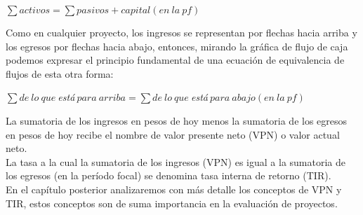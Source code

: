 \begin{center}
   $\sum activos = \sum pasivos + capital(en\ la\ pf)$\\
\end{center}

Como en cualquier proyecto, los ingresos se representan por flechas hacia arriba y los egresos por flechas hacia abajo, entonces, mirando la gráfica de flujo de caja podemos expresar el principio fundamental de una ecuación de equivalencia de flujos de esta otra forma:\\

\begin{center}
   $\sum de\ lo\ que\ $\textit{está}$\ para\ arriba = \sum de\ lo\ que\ $\textit{está}$\ para\ abajo(en\ la\ pf)$\\
\end{center}

La sumatoria de los ingresos en pesos de hoy menos la sumatoria de los egresos en pesos de hoy recibe el nombre de valor presente neto (VPN) o valor actual neto.\\
La tasa a la cual la sumatoria de los ingresos (VPN) es igual a la sumatoria de los egresos (en la período focal) se denomina tasa interna de retorno (TIR).\\
En el capítulo posterior analizaremos con más detalle los conceptos de VPN y TIR, estos conceptos son de suma importancia en la evaluación de proyectos.\\




%
%

